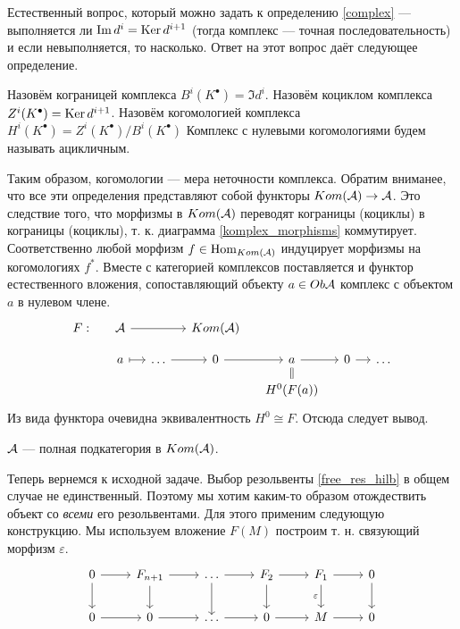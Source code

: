 \documentclass[../hw_main.tex]{subfiles}
\begin{document}
Естественный вопрос, который можно задать к определению \ref{complex} --- выполняется ли $\mathop{\mathrm{Im}}\nolimits d^i = \mathop{\mathrm{Ker}}\nolimits d^{i+1}$ (тогда комплекс --- точная последовательность) и если невыполняется, то насколько. Ответ на этот вопрос даёт следующее определение.
\begin{to_def}
Назовём кограницей комплекса $B^i(K^\bullet) = \Im d^i$.
Назовём коциклом комплекса $Z^i(K^\bullet) = \mathop{\mathrm{Ker}}\nolimits d^{i+1}$.
Назовём когомологией комплекса $H^i(K^\bullet) = Z^i(K^\bullet)/B^i(K^\bullet)$
Комплекс с нулевыми когомологиями будем называть ацикличным.
\end{to_def}
Таким образом, когомологии --- мера неточности комплекса. Обратим вниманее, что все эти определения представляют собой функторы $Kom(\mathcal{A})\to \mathcal{A}$. Это следствие того, что морфизмы в $Kom(\mathcal{A})$ переводят кограницы (коциклы) в кограницы (коциклы), т. к. диаграмма \eqref{komplex_morphisms} коммутирует. Соответственно любой морфизм $f\in \operatorname{Hom}_{Kom(\mathcal{A})}$ индуцирует морфизмы на когомологиях $f^*$.
Вместе с категорией комплексов поставляется и функтор естественного вложения, сопоставляющий объекту $a\in Ob\mathcal{A}$ комплекс с объектом $a$ в нулевом члене.
\begin{equation*}
    \begin{tikzcd}[sep=small]
	{F:} & \A & {} & {Kom(\A)} \\
	{} & a & \ldots & 0 & a & 0 & \ldots \\
	&&&& {H^0(F(a))}
	\arrow[from=2-3, to=2-4]
	\arrow[from=2-4, to=2-5]
	\arrow[from=2-5, to=2-6]
	\arrow[from=2-6, to=2-7]
	\arrow[Rightarrow, no head, from=2-5, to=3-5]
	\arrow[maps to, from=2-2, to=2-3]
	\arrow[from=1-2, to=1-4]
\end{tikzcd}
\end{equation*}
Из вида функтора очевидна эквивалентность $H^0\cong F$. Отсюда следует вывод.
{\color{red}
\begin{to_suj}
$\mathcal{A}$ --- полная подкатегория в $Kom(\mathcal{A})$.
\end{to_suj}}
Теперь вернемся к исходной задаче. Выбор резольвенты \eqref{free_res_hilb} в общем случае не единственный. Поэтому мы хотим каким-то образом отождествить объект со \emph{всеми} его резольвентами. Для этого применим следующую конструкцию. Мы используем вложение $F(M)$ построим т. н. связующий морфизм $\varepsilon$.
\begin{equation*}
    \begin{tikzcd}
	0 & {F_{n+1}} & \ldots & {F_2} & {F_1} & 0 \\
	0 & 0 & \ldots & 0 & M & 0
	\arrow[from=1-6, to=2-6]
	\arrow["\varepsilon"', from=1-5, to=2-5]
	\arrow[from=1-4, to=2-4]
	\arrow[from=1-3, to=2-3]
	\arrow[from=1-2, to=2-2]
	\arrow[from=1-1, to=2-1]
	\arrow[from=1-1, to=1-2]
	\arrow[from=1-2, to=1-3]
	\arrow[from=1-3, to=1-4]
	\arrow[from=1-4, to=1-5]
	\arrow[from=1-5, to=1-6]
	\arrow[from=2-5, to=2-6]
	\arrow[from=2-4, to=2-5]
	\arrow[from=2-3, to=2-4]
	\arrow[from=2-2, to=2-3]
	\arrow[from=2-1, to=2-2]
\end{tikzcd}
\end{equation*}
\end{document}
